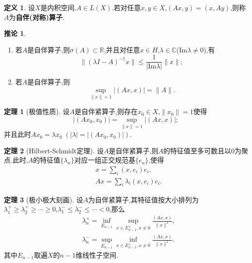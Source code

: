 \documentclass{ctexart}
\theoremstyle{definition}
\newtheorem{definition}{定义}
\newtheorem{theorem}{定理}
\newtheorem{corollary}{推论}
\theoremstyle{remark}
\begin{document}
	\begin{definition}
		设$X$是内积空间,$A\in L(X)$.若对任意$x,y\in X$,$(Ax,y)=(x,Ay)$,则称$A$为\textbf{自伴(对称)算子}.
	\end{definition}
	\begin{corollary}
		\begin{enumerate}
			\item 若$A$是自伴算子,则$\sigma(A)\subset\mathbb{R}$,并且对任意$x\in H$,$\lambda\in\mathbb{C}$($\mathrm{Im}\lambda\ne 0$),有
			$$\|(\lambda I-A)^{-1}x\|\le\frac{1}{|\mathrm{Im}\lambda|}\|x\|;$$
			
			\item 若$A$是自伴算子,则
			$$\sup_{\|x\|=1}{|(Ax,x)|}=\|A\|.$$
		\end{enumerate}
	\end{corollary}
	
	\begin{theorem}[极值性质]
		设$A$是自伴紧算子,则存在$x_0\in X$,$\|x_0\|=1$使得
		$$|(Ax_0,x_0)|=\sup_{\|x\|=1}{|(Ax,x)|};$$
		并且此时$Ax_0=\lambda x_0\;(|\lambda|=|(Ax_0,x_0)|)$.
	\end{theorem}
	\begin{theorem}[Hilbert-Schmidt定理]
		设$A$是自伴紧算子,则$A$的特征值至多可数且以0为聚点.此时,$A$的特征值$\{\lambda_n\}$对应一组正交规范基$\{e_n\}$,使得
		\begin{align*}
			& x=\sum_i{(x,e_i)e_i}, \\
			& Ax=\sum_i{\lambda_i(x,e_i)e_i}.
		\end{align*}
	\end{theorem}
	\begin{theorem}[极小极大刻画]
		设$A$为自伴紧算子,其特征值按大小排列为$\lambda_1^+\ge\lambda_2^+\ge\cdots\ge 0$,$\lambda_1^-\le\lambda_2^-\le\cdots<0$,那么
		\begin{align*}
			& \lambda_n^+=\inf_{E_{n-1}}\sup_{x\in E_{n-1}^\perp,x\ne 0}\frac{(Ax,x)}{\|x\|^2}, \\
			& \lambda_n^-=\sup_{E_{n-1}}\inf_{x\in E_{n-1}^\perp,x\ne 0}\frac{(Ax,x)}{\|x\|^2}.
		\end{align*}
		其中$E_{n-1}$取遍$X$的$n-1$维线性子空间.
	\end{theorem}
	
\end{document}

